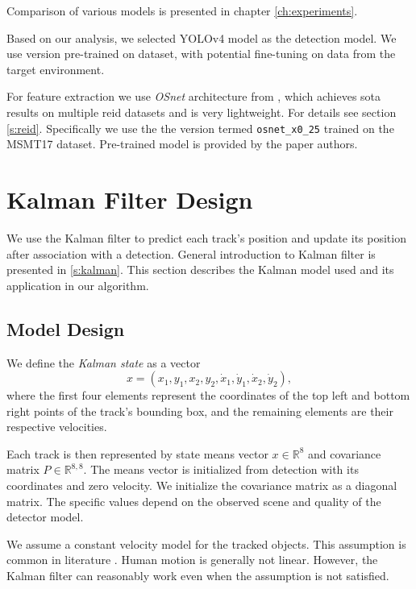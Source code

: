 Comparison of various models is presented in chapter \ref{ch:experiments}.

Based on our analysis, we selected YOLOv4\cite{bochkovskiy2020yolov4} model as the detection model. We use version pre-trained on \cite{shao2018crowdhuman} dataset, with potential fine-tuning on data from the target environment. 

For feature extraction we use \textit{OSnet} architecture from \cite{osnet}, which achieves \gls{sota} results on multiple \gls{reid} datasets and is very lightweight. For details see section \ref{s:reid}. Specifically we use the the version termed \texttt{osnet\_x0\_25} trained on the MSMT17\cite{wei2018person_msmt17} dataset. Pre-trained model is  provided by the paper authors.



\section{Kalman Filter Design}\label{s:kalman_design}

We use the Kalman filter to predict each track's position and update its position after association with a detection. General introduction to Kalman filter is presented in \ref{s:kalman}. This section describes the Kalman model used and its application in our algorithm.

\subsection{Model Design}\label{s:kalman_model_design}

We define the \textit{Kalman state} as a vector
$$
x = ( x_1, y_1, x_2, y_2, \dot{x}_1, \dot{y}_1, \dot{x}_2, \dot{y}_2 ),
$$
where the first four elements represent the coordinates of the top left and bottom right points of the track's bounding box, and the remaining elements are their respective velocities.

Each track is then represented by state means vector $x \in \mathbb{R}^8$ and covariance matrix $P \in \mathbb{R}^{8,8}$. The means vector is initialized from detection with its coordinates and zero velocity. We initialize the covariance matrix as a diagonal matrix. The specific values depend on the observed scene and quality of the detector model.

We assume a constant velocity model for the tracked objects. This assumption is common in literature \cite{Bewley_2016_SORT, Wojke2017_DeepSORT, labbe2014}. Human motion is generally not linear. However, the Kalman filter can reasonably work even when the assumption is not satisfied.

